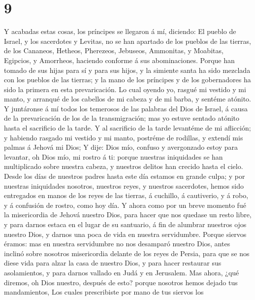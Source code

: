 \hypertarget{section-8}{%
\section{9}\label{section-8}}

 Y acabadas estas cosas, los príncipes se llegaron á mí,
diciendo: El pueblo de Israel, y los sacerdotes y Levitas, no se han
apartado de los pueblos de las tierras, de los Cananeos, Hetheos,
Pherezeos, Jebuseos, Ammonitas, y Moabitas, Egipcios, y Amorrheos,
haciendo conforme á sus abominaciones.  Porque han tomado de
sus hijas para sí y para sus hijos, y la simiente santa ha sido mezclada
con los pueblos de las tierras; y la mano de los príncipes y de los
gobernadores ha sido la primera en esta prevaricación.  Lo
cual oyendo yo, rasgué mi vestido y mi manto, y arranqué de los cabellos
de mi cabeza y de mi barba, y sentéme atónito.  Y juntáronse
á mí todos los temerosos de las palabras del Dios de Israel, á causa de
la prevaricación de los de la transmigración; mas yo estuve sentado
atónito hasta el sacrificio de la tarde.  Y al sacrificio de
la tarde levantéme de mi aflicción; y habiendo rasgado mi vestido y mi
manto, postréme de rodillas, y extendí mis palmas á Jehová mi Dios;
 Y dije: Dios mío, confuso y avergonzado estoy para
levantar, oh Dios mío, mi rostro á ti: porque nuestras iniquidades se
han multiplicado sobre nuestra cabeza, y nuestros delitos han crecido
hasta el cielo.  Desde los días de nuestros padres hasta
este día estamos en grande culpa; y por nuestras iniquidades nosotros,
nuestros reyes, y nuestros sacerdotes, hemos sido entregados en manos de
los reyes de las tierras, á cuchillo, á cautiverio, y á robo, y á
confusión de rostro, como hoy día.  Y ahora como por un
breve momento fué la misericordia de Jehová nuestro Dios, para hacer que
nos quedase un resto libre, y para darnos estaca en el lugar de su
santuario, á fin de alumbrar nuestros ojos nuestro Dios, y darnos una
poca de vida en nuestra servidumbre.  Porque siervos éramos:
mas en nuestra servidumbre no nos desamparó nuestro Dios, antes inclinó
sobre nosotros misericordia delante de los reyes de Persia, para que se
nos diese vida para alzar la casa de nuestro Dios, y para hacer
restaurar sus asolamientos, y para darnos vallado en Judá y en
Jerusalem.  Mas ahora, ¿qué diremos, oh Dios nuestro,
después de esto? porque nosotros hemos dejado tus mandamientos,
 Los cuales prescribiste por mano de tus siervos los
